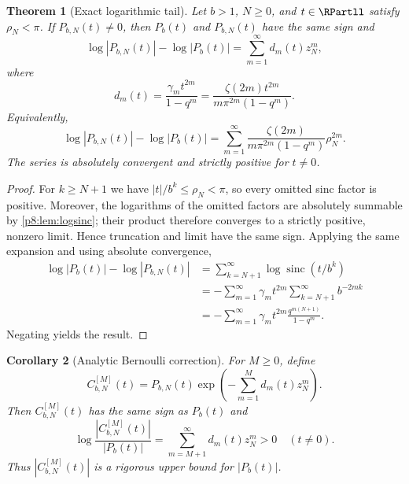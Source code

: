 \documentclass[11pt]{article}
\numberwithin{equation}{section}
\newtheorem{theorem}{Theorem}[section]
\newtheorem{corollary}[theorem]{Corollary}
\theoremstyle{definition}
\theoremstyle{remark}
\newcommand{\sinc}{\operatorname{sinc}}
\begin{document}
\begin{theorem}[Exact logarithmic tail]
\label{p8:thm:exact-tail}
Let $b>1$, $N\ge0$, and $t\in\RPartll$ satisfy $\rho_N<\pi$. If $P_{b,N}(t)\ne0$, then $P_b(t)$ and $P_{b,N}(t)$ have the same sign and
\begin{equation}
\log|P_{b,N}(t)|-\log|P_b(t)|
=\sum_{m=1}^{\infty}d_m(t)z_N^m,
\label{p8:eq:tail-z}
\end{equation}
where
\begin{equation}
d_m(t)=\frac{\gamma_m t^{2m}}{1-q^m}
=\frac{\zeta(2m)t^{2m}}{m\pi^{2m}(1-q^m)}.
\label{p8:eq:dm}
\end{equation}
Equivalently,
\begin{equation}
\log|P_{b,N}(t)|-\log|P_b(t)|
=\sum_{m=1}^{\infty}
\frac{\zeta(2m)}{m\pi^{2m}(1-q^m)}\rho_N^{2m}.
\label{p8:eq:tail-rho}
\end{equation}
The series is absolutely convergent and strictly positive for $t\ne0$.
\end{theorem}

\begin{proof}
For $k\ge N+1$ we have $|t|/b^k\le\rho_N<\pi$, so every omitted sinc factor is positive.
Moreover, the logarithms of the omitted factors are absolutely summable by
\cref{p8:lem:logsinc}; their product therefore converges to a strictly positive, nonzero
limit.  Hence truncation and limit have the same sign.  Applying the same expansion and
using absolute convergence,
\begin{align*}
\log|P_b(t)|-\log|P_{b,N}(t)|
&=\sum_{k=N+1}^{\infty}\log\sinc(t/b^k)\\
&=-\sum_{m=1}^{\infty}\gamma_m t^{2m}
\sum_{k=N+1}^{\infty}b^{-2mk}\\
&=-\sum_{m=1}^{\infty}\gamma_m t^{2m}
\frac{q^{m(N+1)}}{1-q^m}.
\end{align*}
Negating yields the result.
\end{proof}

\begin{corollary}[Analytic Bernoulli correction]
\label{p8:cor:analytic-correction}
For $M\ge0$, define
\begin{equation}
C_{b,N}^{[M]}(t)=P_{b,N}(t)
\exp\!\left(-\sum_{m=1}^{M}d_m(t)z_N^m\right).
\label{p8:eq:analytic-corrected}
\end{equation}
Then $C_{b,N}^{[M]}(t)$ has the same sign as $P_b(t)$ and
\begin{equation}
\log\frac{|C_{b,N}^{[M]}(t)|}{|P_b(t)|}
=\sum_{m=M+1}^{\infty}d_m(t)z_N^m>0
\quad(t\ne0).
\label{p8:eq:analytic-correction-error}
\end{equation}
Thus $|C_{b,N}^{[M]}(t)|$ is a rigorous upper bound for $|P_b(t)|$.
\end{corollary}
\end{document}
